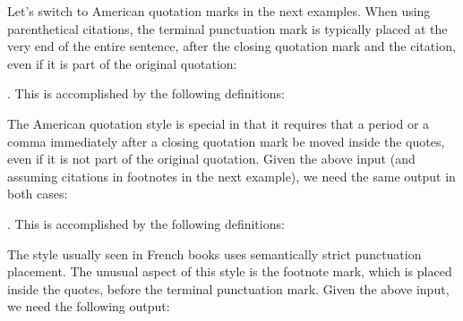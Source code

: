 \documentclass{ltxdockit}[2010/09/26]
\makeatletter
\newcounter{@pseudofootnote}
\newcommand{\@pseudofootnote}[1]{%
  \stepcounter{@pseudofootnote}%
  \textsuperscript{\number\value{@pseudofootnote}}}
\newenvironment{quotesample}[2][]
  {\setquotestyle[#1]{#2}%
   \setcounter{@pseudofootnote}{0}%
   \let\footnote\@pseudofootnote
   \trivlist
   \leftskip\parindent
   \small}
  {\endtrivlist}
\makeatother
\begin{document}
\begin{ltxcode}
\renewcommand{\mkcitation}[1]{\footnote{#1}}
\renewcommand{\mktextquote}[6]{#1#2#4#3#6#5}
\end{ltxcode}
%
Let's switch to American quotation marks in the next examples. When using parenthetical citations, the terminal punctuation mark is typically placed at the very end of the entire sentence, after the closing quotation mark and the citation, even if it is part of the original quotation:

\begin{quotesample}{american}
\renewcommand{\mkcitation}[1]{ (#1)}
\renewcommand{\mktextquote}[6]{#1#2#3#6#4#5}

\item {}
\item {}.
\end{quotesample}
%
This is accomplished by the following definitions:

\begin{ltxcode}
\renewcommand{\mkcitation}[1]{ (#1)}
\renewcommand{\mktextquote}[6]{#1#2#3#6#4#5}
\end{ltxcode}
%
The American quotation style is special in that it requires that a period or a comma immediately after a closing quotation mark be moved inside the quotes, even if it is not part of the original quotation. Given the above input (and assuming citations in footnotes in the next example), we need the same output in both cases:

\begin{quotesample}{american}
\renewcommand{\mkcitation}[1]{\footnote{#1}}
\renewcommand{\mktextquote}[6]{#1#2#4#5#3#6}

\item {}
\item {}.
\end{quotesample}
%
This is accomplished by the following definitions:

\begin{ltxcode}
\renewcommand{\mkcitation}[1]{\footnote{#1}}
\renewcommand{\mktextquote}[6]{#1#2#4#5#3#6}
\end{ltxcode}
%
The style usually seen in French books uses semantically strict punctuation placement. The unusual aspect of this style is the footnote mark, which is placed inside the quotes, before the terminal punctuation mark. Given the above input, we need the following output:
\end{document}
